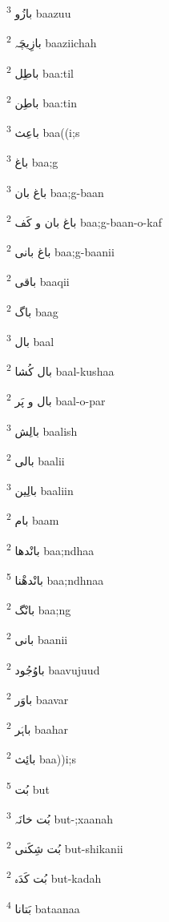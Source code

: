 \documentclass[12pt]{article}
\begin{document}
\begin{multicols}{5}
{\ur بازُو}   \textsuperscript{3} baazuu

{\ur بازِیچَہ}   \textsuperscript{2} baaziichah

{\ur باطِل}   \textsuperscript{2} baa:til

{\ur باطِن}   \textsuperscript{2} baa:tin

{\ur باعِث}   \textsuperscript{3} baa((i;s

{\ur باغ}   \textsuperscript{3} baa;g

{\ur باغ بان}   \textsuperscript{3} baa;g-baan

{\ur باغ بان و کَف}   \textsuperscript{2} baa;g-baan-o-kaf

{\ur باغ بانی}   \textsuperscript{2} baa;g-baanii

{\ur باقی}   \textsuperscript{2} baaqii

{\ur باگ}   \textsuperscript{2} baag

{\ur بال}   \textsuperscript{3} baal

{\ur بال کُشا}   \textsuperscript{2} baal-kushaa

{\ur بال و پَر}   \textsuperscript{2} baal-o-par

{\ur بالِش}   \textsuperscript{3} baalish

{\ur بالی}   \textsuperscript{2} baalii

{\ur بالِین}   \textsuperscript{3} baaliin

{\ur بام}   \textsuperscript{2} baam

{\ur بانْدھا}   \textsuperscript{2} baa;ndhaa

{\ur بانْدھْنا}   \textsuperscript{5} baa;ndhnaa

{\ur بانْگ}   \textsuperscript{2} baa;ng

{\ur بانی}   \textsuperscript{2} baanii

{\ur باوُجُود}   \textsuperscript{2} baavujuud

{\ur باوَر}   \textsuperscript{2} baavar

{\ur باہَر}   \textsuperscript{2} baahar

{\ur بائِث}   \textsuperscript{2} baa))i;s

{\ur بُت}   \textsuperscript{5} but

{\ur بُت خانَہ}   \textsuperscript{3} but-;xaanah

{\ur بُت شِکَنی}   \textsuperscript{2} but-shikanii

{\ur بُت کَدَہ}   \textsuperscript{2} but-kadah

{\ur بَتانا}   \textsuperscript{4} bataanaa


\end{multicols}
\end{document}

